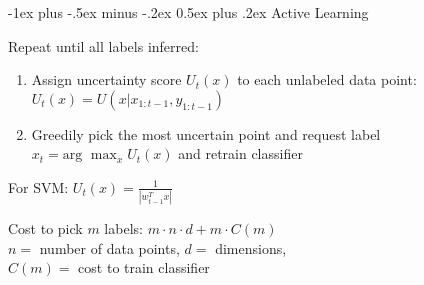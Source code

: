\documentclass[11pt,landscape]{article}
\makeatletter
\renewcommand{\section}{\@startsection{section}{1}{0mm}%
                                {-1ex plus -.5ex minus -.2ex}%
                                {0.5ex plus .2ex}%
                                {\color{sectionColor}\normalfont\normalsize\bfseries}}
\makeatother
\begin{document}
\begin{multicols}{3}
\section{Active Learning}
\begin{description}
    \item[Uncertainty sampling] Repeat until all labels inferred:
    \begin{enumerate}
        \item Assign uncertainty score $U_t(x)$ to each unlabeled data point:
        $U_t(x) = U \left ( x | x_{1:t-1},y_{1:t-1} \right )$
        \item Greedily pick the most uncertain point and request label
        $x_t = \text{arg } \max_x U_t(x)$ and retrain classifier
    \end{enumerate}
    \item For SVM: $U_t(x) = \frac{1}{|w_{t-1}^T x|}$
    \item Cost to pick $m$ labels: $m \cdot n \cdot d + m \cdot C(m)$\\
        $n =$ number of data points, $d =$ dimensions,\\
        $C(m) =$ cost to train classifier


\end{description}
\end{multicols}
\end{document}
